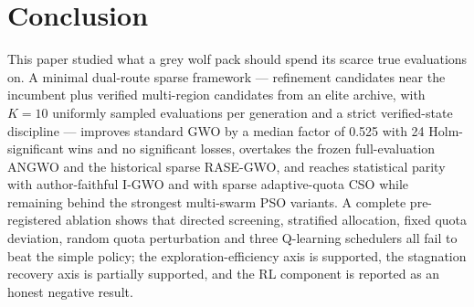 \documentclass[journal]{IEEEtran}
\begin{document}
\section{Conclusion}
This paper studied what a grey wolf pack should spend its scarce true
evaluations on. A minimal dual-route sparse framework --- refinement
candidates near the incumbent plus verified multi-region candidates from an
elite archive, with $K=10$ uniformly sampled evaluations per generation and
a strict verified-state discipline --- improves standard GWO by a median
factor of 0.525 with 24 Holm-significant wins and no significant losses,
overtakes the frozen full-evaluation ANGWO and the historical sparse
RASE-GWO, and reaches statistical parity with author-faithful I-GWO and
with sparse adaptive-quota CSO while remaining behind the strongest
multi-swarm PSO variants. A complete pre-registered ablation shows that
directed screening, stratified allocation, fixed quota deviation, random
quota perturbation and three Q-learning schedulers all fail to beat the
simple policy; the exploration-efficiency axis is supported, the stagnation
recovery axis is partially supported, and the RL component is reported as
an honest negative result.

\end{document}
